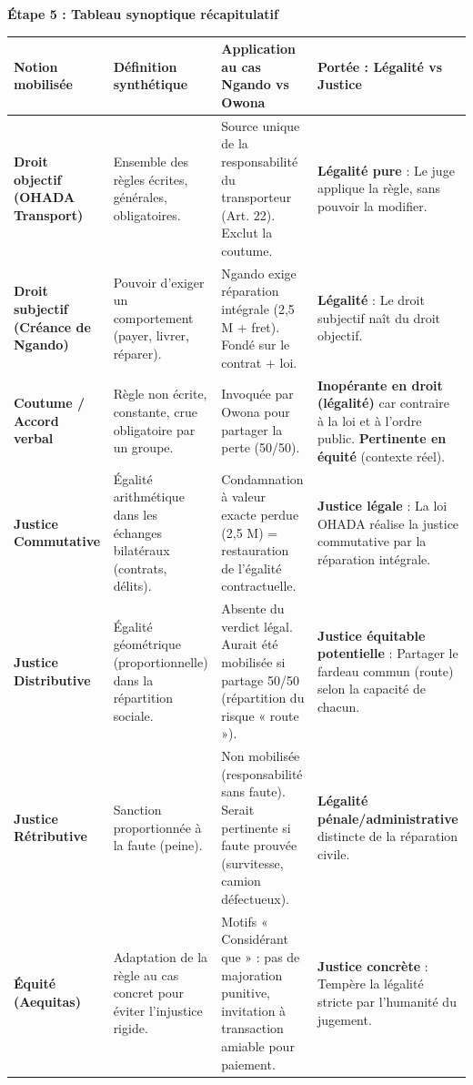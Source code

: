 \documentclass[11pt]{article}
\begin{document}
\begin{exoresolu}
\textbf{Étape 5 : Tableau synoptique récapitulatif}
\begin{center}
\begin{tabularx}{\linewidth}{|l|X|X|X|}\hline
\rowcolor{popblueL}
\textbf{Notion mobilisée} & \textbf{Définition synthétique} & \textbf{Application au cas Ngando vs Owona} & \textbf{Portée : Légalité vs Justice} \\ \hline
\textbf{Droit objectif (OHADA Transport)} & Ensemble des règles écrites, générales, obligatoires. & Source unique de la responsabilité du transporteur (Art. 22). Exclut la coutume. & \textbf{Légalité pure} : Le juge applique la règle, sans pouvoir la modifier. \\ \hline
\textbf{Droit subjectif (Créance de Ngando)} & Pouvoir d'exiger un comportement (payer, livrer, réparer). & Ngando exige réparation intégrale (2,5 M + fret). Fondé sur le contrat + loi. & \textbf{Légalité} : Le droit subjectif naît du droit objectif. \\ \hline
\textbf{Coutume / Accord verbal} & Règle non écrite, constante, crue obligatoire par un groupe. & Invoquée par Owona pour partager la perte (50/50). & \textbf{Inopérante en droit (légalité)} car contraire à la loi et à l'ordre public. \textbf{Pertinente en équité} (contexte réel). \\ \hline
\textbf{Justice Commutative} & Égalité arithmétique dans les échanges bilatéraux (contrats, délits). & Condamnation à valeur exacte perdue (2,5 M) = restauration de l'égalité contractuelle. & \textbf{Justice légale} : La loi OHADA réalise la justice commutative par la réparation intégrale. \\ \hline
\textbf{Justice Distributive} & Égalité géométrique (proportionnelle) dans la répartition sociale. & Absente du verdict légal. Aurait été mobilisée si partage 50/50 (répartition du risque « route »). & \textbf{Justice équitable potentielle} : Partager le fardeau commun (route) selon la capacité de chacun. \\ \hline
\textbf{Justice Rétributive} & Sanction proportionnée à la faute (peine). & Non mobilisée (responsabilité sans faute). Serait pertinente si faute prouvée (survitesse, camion défectueux). & \textbf{Légalité pénale/administrative} distincte de la réparation civile. \\ \hline
\textbf{Équité (Aequitas)} & Adaptation de la règle au cas concret pour éviter l'injustice rigide. & Motifs « Considérant que » : pas de majoration punitive, invitation à transaction amiable pour paiement. & \textbf{Justice concrète} : Tempère la légalité stricte par l'humanité du jugement. \\ \hline
\end{tabularx}
\end{center}


\end{exoresolu}
\end{document}
